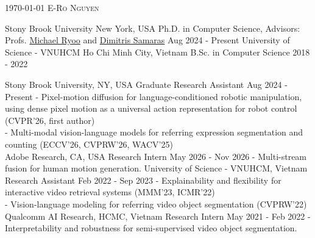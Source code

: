 \documentclass[localFont,alternative]{yaac-another-awesome-cv}
\begin{document}
    \makecvheader
    \makecvfooter
        {\textsc{\today}}
        {\textsc{E-Ro Nguyen}}
        {\thepage}

    \begin{educations}
    \education
        {Stony Brook University}   {New York, USA}
        {Ph.D. in Computer Science, Advisors: Profs. \href{http://michaelryoo.com/}{Michael Ryoo} and \href{https://scholar.google.com/citations?user=BxbKTYkAAAAJ}{Dimitris Samaras}} {Aug 2024 - Present}
    \emptySeparator
    \education
        {University of Science - VNUHCM}   {Ho Chi Minh City, Vietnam}
        {B.Sc. in Computer Science} {2018 - 2022}
    \end{educations}
    \vspace{-3mm}

    \begin{experiences}
    \researchexperience
        {Stony Brook University, NY, USA}
        {Graduate Research Assistant} {Aug 2024 - Present}
        {
            - Pixel-motion diffusion for language-conditioned robotic manipulation, using dense pixel motion as a universal action representation for robot control (CVPR'26, first author) \\
            - Multi-modal vision-language models for referring expression segmentation and counting (ECCV'26, CVPRW'26, WACV'25) \\
        }
    \emptySeparator
    \researchexperience
        {Adobe Research, CA, USA}
        {Research Intern} {May 2026 - Nov 2026}
        {
            - Multi-stream fusion for human motion generation.
        }
    \emptySeparator
    \researchexperience
        {University of Science - VNUHCM, Vietnam}
        {Research Assistant} {Feb 2022 - Sep 2023}
        {
            - Explainability and flexibility for interactive video retrieval systems (MMM'23, ICMR'22) \\
            - Vision-language modeling for referring video object segmentation (CVPRW'22) \\
        }
    \emptySeparator
    \researchexperience
        {Qualcomm AI Research, HCMC, Vietnam}
        {Research Intern} {May 2021 - Feb 2022}
        {
            - Interpretability and robustness for semi-supervised video object segmentation.
        }
    \end{experiences}
\end{document}
